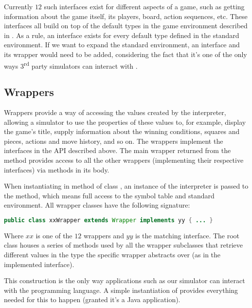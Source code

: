 

Currently $12$ such interfaces exist for different aspects of a game,
such as getting information about the game itself, its players, board,
action sequences, etc. These interfaces all build on top of the default
types in the game environment described in . As a
rule, an interface exists for every default type defined in the standard
environment. If we want to expand the standard environment, an interface
and its wrapper would need to be added, considering the fact that it's
one of the only ways 3\textsuperscript{rd} party simulators can interact
with \productname{}.

\subsection{Wrappers}
Wrappers provide a way of accessing the values created by the
interpreter, allowing a simulator to use the properties of these
values to, for example, display the game's title, supply information
about the winning conditions, squares and pieces, actions and move
history, and so on. The wrappers implement the interfaces in the
API described above. The main wrapper returned from the method
 provides access to all the other wrappers
(implementing their respective interfaces) via methods in its body.

When instantiating  in method 
of class , an instance of the interpreter
is passed to the method, which means full access to the symbol table and
standard environment. All wrapper classes have the following signature:

\begin{lstlisting}[language=Java,caption={The signaure of all API wrapper classes.}]
  public class xxWrapper extends Wrapper implements yy { ... }
\end{lstlisting}

Where $xx$ is one of the $12$ wrappers and $yy$ is the matching
interface. The root class  houses a series of methods
used by all the wrapper subclasses that retrieve different values in
the type the specific wrapper abstracts over (as in the implemented
interface).

This construction is the only way applications such as our simulator
can interact with the programming language. A simple instantiation of
 provides everything needed for this to
happen (granted it's a Java application).
